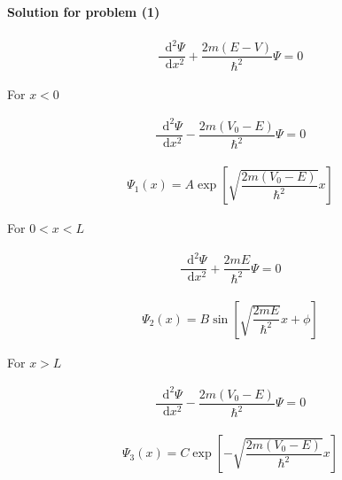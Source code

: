 \documentclass{article}
\newcommand*{\md}{\mathop{}\!\mathrm{d}}
\begin{document}
\paragraph{Solution for problem (1)}

\begin{equation*}
  \begin{aligned}
    \dfrac{\md^2 \Psi}{\md x^2} + \dfrac{2 m \left( E - V \right)}{\hbar^2} \Psi = 0
  \end{aligned}
\end{equation*}

For $x < 0$

\begin{equation*}
  \begin{aligned}
    \dfrac{\md^2 \Psi}{\md x^2} - \dfrac{2 m \left( V_0 - E \right)}{\hbar^2} \Psi = 0
  \end{aligned}
\end{equation*}

\begin{equation*}
  \begin{aligned}
    \Psi_1 \left( x \right) = A \exp \left[ \sqrt{\dfrac{2 m \left( V_0 - E \right)}{\hbar^2} } x \right]
  \end{aligned}
\end{equation*}

For $0 < x < L$

\begin{equation*}
  \begin{aligned}
     \dfrac{\md^2 \Psi}{\md x^2} + \dfrac{2 m E}{\hbar^2} \Psi = 0   
  \end{aligned}
\end{equation*}

\begin{equation*}
  \begin{aligned}
    \Psi_2 \left( x \right) = B \sin \left[ \sqrt{\dfrac{2 m E}{\hbar^2} } x + \phi \right]
  \end{aligned}
\end{equation*}

For $x > L$

\begin{equation*}
  \begin{aligned}
    \dfrac{\md^2 \Psi}{\md x^2} - \dfrac{2 m \left( V_0 - E \right)}{\hbar^2} \Psi = 0
  \end{aligned}
\end{equation*}

\begin{equation*}
  \begin{aligned}
    \Psi_3 \left( x \right) = C \exp \left[ - \sqrt{\dfrac{2 m \left( V_0 - E \right)}{\hbar^2} } x \right]
  \end{aligned}
\end{equation*}
\end{document}
